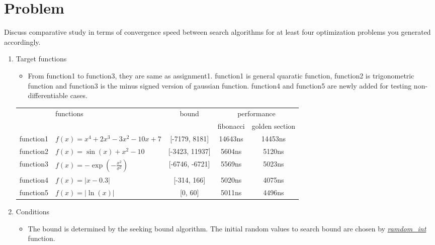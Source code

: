 \documentclass[12pt,letterpaper]{article}
\begin{document}
\section*{Problem}

Discuss comparative study in terms of convergence speed between search algorithms for at least four optimization problems you generated accordingly.

\begin{enumerate}
\item Target functions
\begin{itemize}
\item From function1 to function3, they are same as assignment1. 
function1 is general quaratic function, function2 is trigonometric function and  
function3 is the minus signed version of gaussian function. 
function4 and function5 are newly added for testing non-differentiable cases.
\end{itemize}
\begin{center}
    \begin{tabular}{| c | l | c | c | c |} \hline
                  & \multirow{2}{*}{functions}            & \multirow{2}{*}{bound} & \multicolumn{2}{c|}{performance} \\ \cline{4-5}
                  &                                       &                        & fibonacci & golden section\\ \hline
        function1 & $f(x)=x^4 +2x^3-3x^2-10x+7$           & [-7179, 8181]          &  14643ns  & 14453ns   \\
        function2 & $f(x)=\sin(x)+x^2-10$                 & [-3423, 11937]         &  5604ns   & 5120ns    \\
        function3 & $f(x)=-\exp(-\frac{x^2}{\sigma ^2})$  & [-6746, -6721]         &  5569ns   & 5023ns    \\
        function4 & $f(x)=|x-0.3|$                        & [-314, 166]            &  5020ns   & 4075ns    \\
        function5 & $f(x)=|\ln(x)|$                       & [0, 60]                &  5011ns   & 4496ns    \\
        \hline
    \end{tabular}
\end{center}

\item Conditions
\begin{itemize}
\item The bound is determined by the seeking bound algorithm. 
The initial random values to search bound are chosen by 
\hyperref[func:random]{\emph{ramdom\_int}} function.
\end{itemize}


\end{enumerate}
\end{document}

